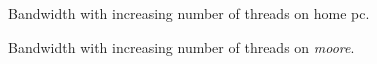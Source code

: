 \documentclass[DIV=12,oneside,a4paper]{scrartcl}
\begin{document}
\begin{figure}
	
	\label{threads_local}
	\caption{Bandwidth with increasing number of threads on home pc.}
\end{figure}

\begin{figure}
	
	\label{threads_remote}
	\caption{Bandwidth with increasing number of threads on \emph{moore}.}

\end{figure}
\end{document}
